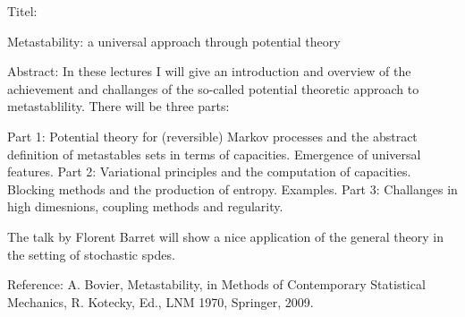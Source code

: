 Titel:

   Metastability: a universal approach through potential theory


Abstract: In these lectures I will give an introduction and overview of the
  achievement and challanges of the so-called potential theoretic approach to 
metastablility. There will be three parts:

Part 1: Potential theory for (reversible) 
Markov processes and the abstract definition of metastables sets in terms of 
capacities. Emergence of universal features.
Part 2: Variational principles and the computation of capacities. 
Blocking methods and the production of entropy. Examples.
Part 3: Challanges in high dimesnions, coupling methods and regularity. 

The talk by Florent Barret will show a nice application of the general theory 
in the setting of stochastic spdes. 

Reference: A. Bovier, Metastability,  in Methods of Contemporary Statistical 
Mechanics, R. Kotecky, Ed., LNM 1970, Springer, 2009.